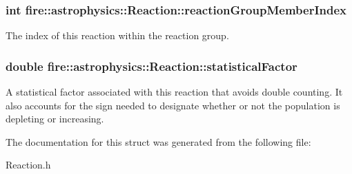 \subsubsection[{reaction\+Group\+Member\+Index}]{\setlength{\rightskip}{0pt plus 5cm}int fire\+::astrophysics\+::\+Reaction\+::reaction\+Group\+Member\+Index}\label{a00033_adb666fe2c511b5a5e86ebcd35ba7faa4}
The index of this reaction within the reaction group. \hypertarget{a00033_a439daff55fecd97cafc96f204570376a}{}
\subsubsection[{statistical\+Factor}]{\setlength{\rightskip}{0pt plus 5cm}double fire\+::astrophysics\+::\+Reaction\+::statistical\+Factor}\label{a00033_a439daff55fecd97cafc96f204570376a}
A statistical factor associated with this reaction that avoids double counting. It also accounts for the sign needed to designate whether or not the population is depleting or increasing. 

The documentation for this struct was generated from the following file\+:\begin{DoxyCompactItemize}
\item 
Reaction.\+h\end{DoxyCompactItemize}
